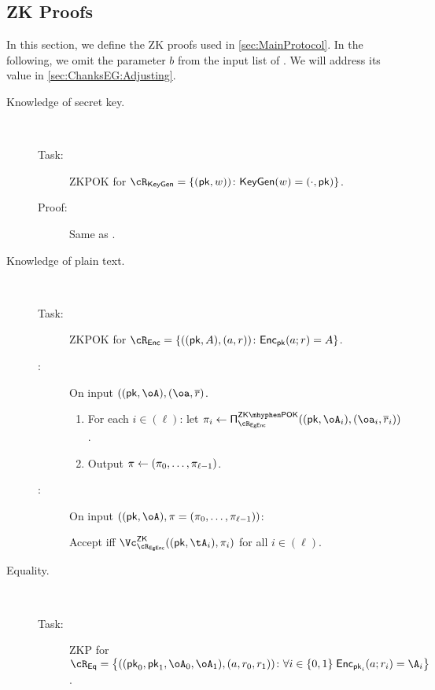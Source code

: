 \subsection{ZK Proofs}\label{sec:ChanksEG:Proofs}
In this section, we define the ZK proofs used in  \cref{sec:MainProtocol}.
In the following, we omit the parameter $b$ from the input list of  \Dec.  We will address its value in \cref{sec:ChanksEG:Adjusting}.


\begin{description}
	\item[Knowledge of secret key.] ~
	
	\begin{description}
		\item[Task:] ZKPOK for $\rKeyGen=\rKeyGenDef$.
		
		\item[Proof:] Same as \piZKPOK{\rEgKeyGen}. 
		
	\end{description}
	
	
	\item[Knowledge of plain text.] ~
	
	

	\begin{description}
		\item[Task:] ZKPOK for $\rEnc=\rEncDef$.
		
		\item[\Pc:] On  input  $((\pk,\oA),(\oa,\orr)$.
		\begin{enumerate}
			\item For each $i\in (\ell)$: let  $\pi_i \asn \piZKPOK{\rEGEnc}((\pk,\oA_i),(\oa_i,\orr_i))$. 
			
			\item Output $\pi \leftarrow (\pi_0,\ldots, \pi_{\ell-1})$.
			
		\end{enumerate}
		
		
	\item[\Vc:] On  input  $((\pk,\oA),\pi = (\pi_0,\ldots, \pi_{\ell-1}))$:
	
	 Accept iff  $\vZK{\rEGEnc}((\pk,\tA_i), \pi_i)$ for all $i\in (\ell)$.
		
	\end{description}
	
\item[Equality.]~ 


\begin{description}
	\item[Task:] ZKP for $\rEq =\rEqDef$.
	

\end{description}
\end{description}
